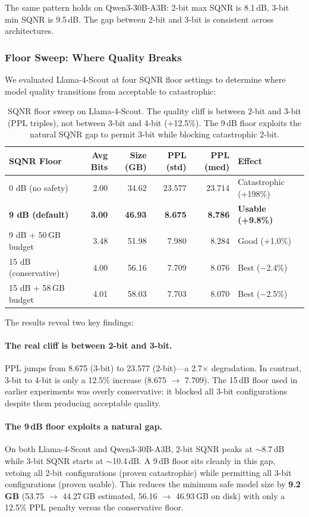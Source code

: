 \documentclass{article}
\begin{document}
The same pattern holds on Qwen3-30B-A3B: 2-bit max SQNR is 8.1\,dB, 3-bit min SQNR is 9.5\,dB. The gap between 2-bit and 3-bit is consistent across architectures.

\subsubsection{Floor Sweep: Where Quality Breaks}

We evaluated Llama-4-Scout at four SQNR floor settings to determine where model quality transitions from acceptable to catastrophic:

\begin{table}[h]
\centering
\caption{SQNR floor sweep on Llama-4-Scout. The quality cliff is between 2-bit and 3-bit (PPL triples), not between 3-bit and 4-bit (+12.5\%). The 9\,dB floor exploits the natural SQNR gap to permit 3-bit while blocking catastrophic 2-bit.}
\label{tab:sqnr}
\begin{tabular}{lrrrrl}
\toprule
SQNR Floor & Avg Bits & Size (GB) & PPL (std) & PPL (med) & Effect \\
\midrule
0 dB (no safety) & 2.00 & 34.62 & 23.577 & 23.714 & Catastrophic (+198\%) \\
\textbf{9 dB (default)} & \textbf{3.00} & \textbf{46.93} & \textbf{8.675} & \textbf{8.786} & \textbf{Usable (+9.8\%)} \\
9 dB + 50\,GB budget & 3.48 & 51.98 & 7.980 & 8.284 & Good (+1.0\%) \\
15 dB (conservative) & 4.00 & 56.16 & 7.709 & 8.076 & Best ($-$2.4\%) \\
15 dB + 58\,GB budget & 4.01 & 58.03 & 7.703 & 8.070 & Best ($-$2.5\%) \\
\bottomrule
\end{tabular}
\end{table}

The results reveal two key findings:

\paragraph{The real cliff is between 2-bit and 3-bit.} PPL jumps from 8.675 (3-bit) to 23.577 (2-bit)---a 2.7$\times$ degradation. In contrast, 3-bit to 4-bit is only a 12.5\% increase (8.675 $\rightarrow$ 7.709). The 15\,dB floor used in earlier experiments was overly conservative: it blocked all 3-bit configurations despite them producing acceptable quality.

\paragraph{The 9\,dB floor exploits a natural gap.} On both Llama-4-Scout and Qwen3-30B-A3B, 2-bit SQNR peaks at ${\sim}$8.7\,dB while 3-bit SQNR starts at ${\sim}$10.4\,dB. A 9\,dB floor sits cleanly in this gap, vetoing all 2-bit configurations (proven catastrophic) while permitting all 3-bit configurations (proven usable). This reduces the minimum safe model size by \textbf{9.2\,GB} (53.75 $\rightarrow$ 44.27\,GB estimated, 56.16 $\rightarrow$ 46.93\,GB on disk) with only a 12.5\% PPL penalty versus the conservative floor.
\end{document}
